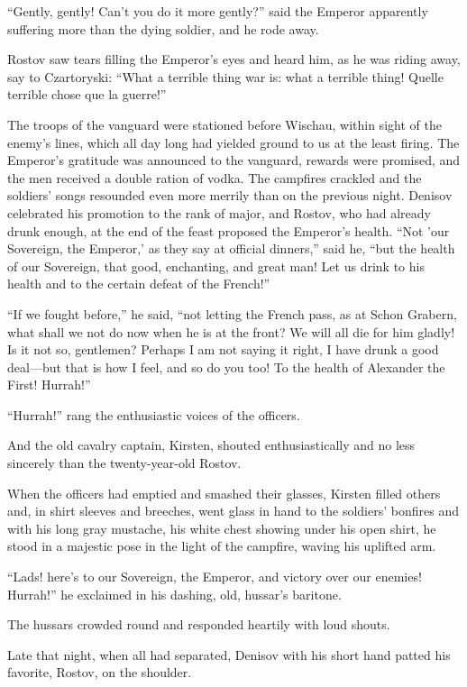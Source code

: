 ``Gently, gently! Can't you do it more gently?'' said the Emperor
apparently suffering more than the dying soldier, and he rode
away.

Rostov saw tears filling the Emperor's eyes and heard him, as he
was riding away, say to Czartoryski: ``What a terrible thing war
is: what a terrible thing! Quelle terrible chose que la guerre!''

The troops of the vanguard were stationed before Wischau, within
sight of the enemy's lines, which all day long had yielded ground
to us at the least firing. The Emperor's gratitude was announced
to the vanguard, rewards were promised, and the men received a
double ration of vodka.  The campfires crackled and the soldiers'
songs resounded even more merrily than on the previous
night. Denisov celebrated his promotion to the rank of major, and
Rostov, who had already drunk enough, at the end of the feast
proposed the Emperor's health. ``Not 'our Sovereign, the
Emperor,' as they say at official dinners,'' said he, ``but the
health of our Sovereign, that good, enchanting, and great man!
Let us drink to his health and to the certain defeat of the
French!''

``If we fought before,'' he said, ``not letting the French pass,
as at Schon Grabern, what shall we not do now when he is at the
front? We will all die for him gladly! Is it not so, gentlemen?
Perhaps I am not saying it right, I have drunk a good deal---but
that is how I feel, and so do you too! To the health of Alexander
the First! Hurrah!''

``Hurrah!'' rang the enthusiastic voices of the officers.

And the old cavalry captain, Kirsten, shouted enthusiastically
and no less sincerely than the twenty-year-old Rostov.

When the officers had emptied and smashed their glasses, Kirsten
filled others and, in shirt sleeves and breeches, went glass in
hand to the soldiers' bonfires and with his long gray mustache,
his white chest showing under his open shirt, he stood in a
majestic pose in the light of the campfire, waving his uplifted
arm.

``Lads! here's to our Sovereign, the Emperor, and victory over
our enemies! Hurrah!'' he exclaimed in his dashing, old, hussar's
baritone.

The hussars crowded round and responded heartily with loud
shouts.

Late that night, when all had separated, Denisov with his short
hand patted his favorite, Rostov, on the shoulder.

